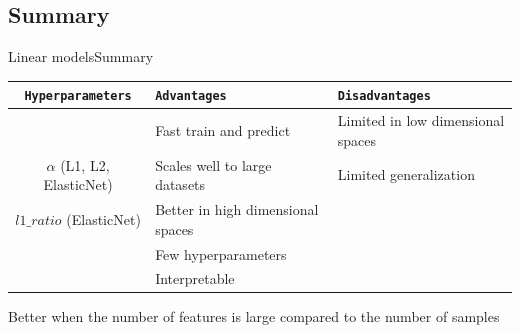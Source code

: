 \documentclass[10pt,compress]{beamer} %
\begin{document}
\subsection{Summary}
\begin{frame}{Linear models}{Summary}
	\begin{center}
	\begin{tabular}{cp{3cm}p{3cm}}\hline
	 	\texttt{Hyperparameters}  & \texttt{Advantages}  & \texttt{Disadvantages} \\\hline
	 	                          & Fast train and predict        & Limited in low dimensional spaces  \\
	 	 $\alpha$ (L1, L2, ElasticNet) & Scales well to large datasets & Limited generalization  \\
	 	 $l1\_ratio$ (ElasticNet) & Better in high dimensional spaces  &   \\
	 	                          & Few hyperparameters           &   \\
	 	                          & Interpretable                 &   \\
	 	\hline
	\end{tabular}
    \end{center}

    Better when the number of features is large compared to the number of samples

\end{frame}
\end{document}
